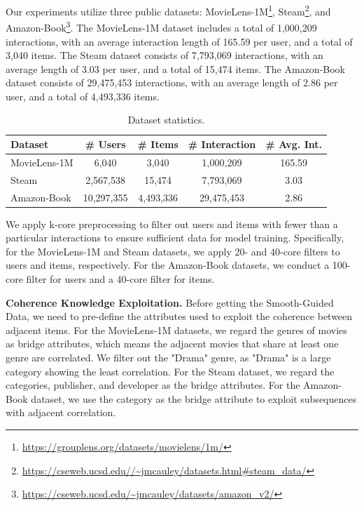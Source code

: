 Our experiments utilize three public datasets: MovieLens-1M\footnote{\url{https://grouplens.org/datasets/movielens/1m/}}, Steam\footnote{\url{https://cseweb.ucsd.edu//~jmcauley/datasets.html\#steam_data/}}, and Amazon-Book\footnote{\url{https://cseweb.ucsd.edu/~jmcauley/datasets/amazon_v2/}}. The MovieLens-1M dataset includes a total of 1,000,209 interactions, with an average interaction length of 165.59 per user, and a total of 3,040 items. The Steam dataset consists of 7,793,069 interactions, with an average length of 3.03 per user, and a total of 15,474 items. The Amazon-Book dataset consists of 29,475,453 interactions, with an average length of 2.86 per user, and a total of 4,493,336 items.

\begin{table}[t]
\caption{Dataset statistics.}
\label{tab:dataset_appendix}
 \begin{center}
\begin{tabular}{lcccc}
 \toprule[1.5pt]
 \textbf{Dataset} & \textbf{\# Users} & \textbf{\# Items} & \textbf{\# Interaction} & \textbf{\# Avg. Int.} \\
 \midrule
 MovieLens-1M & 6,040 & 3,040 & 1,000,209 & 165.59\\
 Steam & 2,567,538 & 15,474 & 7,793,069 & 3.03  \\
 Amazon-Book & 10,297,355 & 4,493,336  & 29,475,453 & 2.86  \\
 \bottomrule[1.5pt]
 \end{tabular}
 \end{center}
 \end{table}

We apply k-core preprocessing to filter out users and items with fewer than a particular interactions to ensure sufficient data for model training. Specifically, for the MovieLens-1M and Steam datasets, we apply 20- and 40-core filters to users and items, respectively. For the Amazon-Book datasets, we conduct a 100-core filter for users and a 40-core filter for items. 

\textbf{Coherence Knowledge Exploitation.} Before getting the Smooth-Guided Data, we need to pre-define the attributes used to exploit the coherence between adjacent items. For the MovieLens-1M datasets, we regard the genres of movies as bridge attributes, which means the adjacent movies that share at least one genre are correlated. We filter out the "Drama" genre, as "Drama" is a large category showing the least correlation. For the Steam dataset, we regard the categories, publisher, and developer as the bridge attributes. For the Amazon-Book dataset, we use the category as the bridge attribute to exploit subsequences with adjacent correlation.

